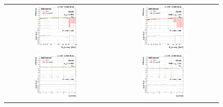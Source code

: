 \begin{figure}[bh]
  \begin{center}
    \begin{tabular}{cc}
      \includegraphics[width=0.45\textwidth]{figures/Zprime/2017/ScaleFactor/SameSign/N-1/g_compare_cut_Et_Barrel_ea_ta_inc_AS_N_1_DPhiIn_PUW.png} &
      \includegraphics[width=0.45\textwidth]{figures/Zprime/2017/ScaleFactor/SameSign/N-1/g_compare_cut_Et_Endcap_ea_ta_inc_AS_N_1_DPhiIn_PUW.png} \\
      \includegraphics[width=0.45\textwidth]{figures/Zprime/2017/ScaleFactor/SameSign/N-1/g_compare_cut_phi_Barrel_ea_ta_inc_AS_N_1_DPhiIn_PUW.png} &
      \includegraphics[width=0.45\textwidth]{figures/Zprime/2017/ScaleFactor/SameSign/N-1/g_compare_cut_phi_Endcap_ea_ta_inc_AS_N_1_DPhiIn_PUW.png} \\

\end{tabular}
\end{center}
\end{figure}
